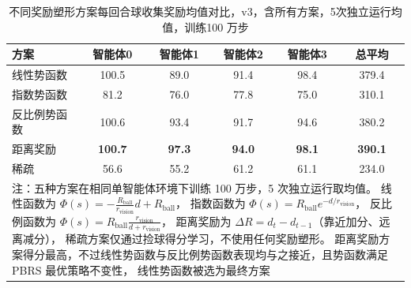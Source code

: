 \documentclass[12pt, a4paper, UTF8]{ctexart}
\numberwithin{equation}{section}
\begin{document}
\begin{table}[htbp]
  \centering
  \caption{ 不同奖励塑形方案每回合球收集奖励均值对比，v3，含所有方案，5次独立运行均值，训练100 万步}
  \label{tab:appendix_potential_v3}
  \begin{tabular}{lccccc}
    \toprule
    方案 & 智能体0 & 智能体1 & 智能体2 & 智能体3 & 总平均 \\
    \midrule
    线性势函数   & 100.5 & 89.0  & 91.4 & 98.4 & 379.4 \\
    指数势函数   & 81.2  & 76.0  & 77.8 & 75.0 & 310.1 \\
    反比例势函数 & 100.6 & 93.4  & 91.7 & 94.6 & 380.2 \\
    距离奖励     & \textbf{100.7} & \textbf{97.3}  & \textbf{94.0} & \textbf{98.1} & \textbf{390.1} \\
    稀疏         & 56.6  & 55.2  & 61.2 & 61.1 & 234.0 \\
    \midrule
    \multicolumn{6}{p{0.85\textwidth}}{%
      注：五种方案在相同单智能体环境下训练 100 万步，5 次独立运行取均值。
      线性函数为 $\Phi(s)=-\frac{R_{\mathrm{ball}}}{r_{\mathrm{vision}}}d+R_{\mathrm{ball}}$，
      指数函数为 $\Phi(s)=R_{\mathrm{ball}}e^{-d/r_{\mathrm{vision}}}$，
      反比例函数为 $\Phi(s)=R_{\mathrm{ball}}\frac{r_{\mathrm{vision}}}{d+r_{\mathrm{vision}}}$，
      距离奖励为 $\Delta R = d_t - d_{t-1}$（靠近加分、远离减分），
      稀疏方案仅通过捡球得分学习，不使用任何奖励塑形。
      距离奖励方案得分最高，不过线性势函数与反比例势函数表现均与之接近，且势函数满足 PBRS 最优策略不变性，
      线性势函数被选为最终方案} \\
  \end{tabular}
\end{table}
\end{document}
